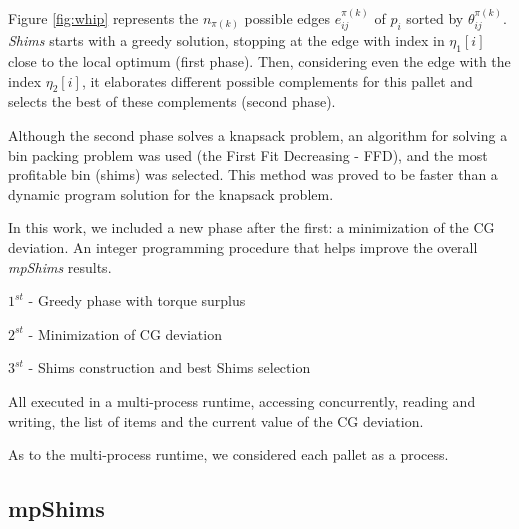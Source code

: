 \documentclass[preprint,authoryear]{elsarticle}
\begin{document}
\begin{table}[H]
\begin{minipage}{0.58\linewidth}
		\label{fig:whip}		
	\end{minipage}
\end{table}

{\color{blue}
Figure \ref{fig:whip} represents the $n_{\pi(k)}$\/ possible edges $e_{ij}^{\pi(k)}$\/ of $p_i$\/ sorted by $\theta_{ij}^{\pi(k)}$. \emph{Shims}\/ starts with a greedy solution, stopping at the edge with index in $\eta_1[i]$ close to the local optimum (first phase). Then, considering even the edge with the index $\eta_2[i]$, it elaborates different possible complements for this pallet and selects the best of these complements (second phase).

Although the second phase solves a knapsack problem, an algorithm for solving a bin packing problem was used (the First Fit Decreasing - FFD), and the most profitable bin (shims) was selected. This method was proved to be faster than a dynamic program solution for the knapsack problem.
		
	In this work, we included a new phase after the first: a minimization of the CG deviation. An integer programming procedure that helps improve the overall {\it mpShims} results.

$1^{st}$ - Greedy phase with torque surplus

$2^{st}$ - Minimization of CG deviation

$3^{st}$ - Shims construction and best Shims selection

All executed in a multi-process runtime, accessing concurrently, reading and writing, the list of items and the current value of the CG deviation.

As to the multi-process runtime, we considered each pallet as a process.
}


\subsection{mpShims}
\end{document}
